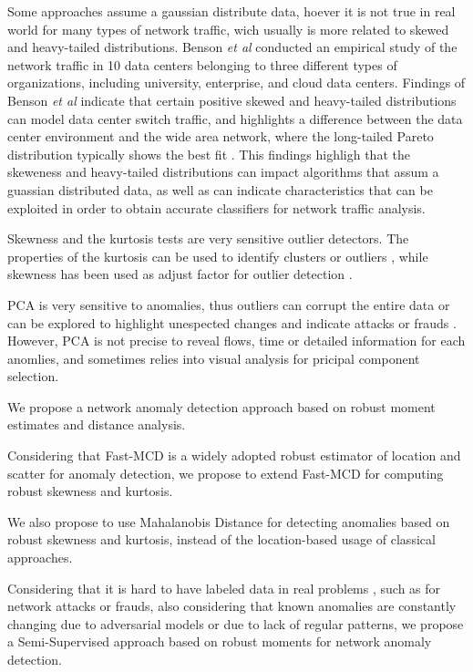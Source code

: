 \documentclass[review]{elsarticle}
\begin{document}
Some approaches assume a gaussian distribute data, hoever it is not true in real world for many types of network traffic, wich usually is more related to skewed and heavy-tailed distributions. Benson \emph{et al} \cite{benson2010network} conducted an empirical study of the network traffic in 10 data centers belonging to three different types of organizations, including university, enterprise, and cloud data centers. Findings of Benson \emph{et al} indicate that certain positive skewed and heavy-tailed distributions can model data center switch traffic, and highlights a difference between the data center environment and the wide area network, where the long-tailed Pareto distribution typically shows the best fit \cite{benson2010network}. This findings highligh that the skeweness and heavy-tailed distributions can impact algorithms that assum a guassian distributed data, as well as can indicate characteristics that can be exploited in order to obtain accurate classifiers for network traffic analysis.

Skewness and the kurtosis tests are very sensitive outlier detectors. The properties of the kurtosis can be used to identify clusters or outliers \cite{pena2010eigenvectors}, while skewness has been used as adjust factor for outlier detection \cite{hubert2009robustskewed}.

PCA is very sensitive to anomalies, thus outliers can corrupt the entire data or can be explored to highlight unespected changes and indicate attacks or frauds \cite{callegari2011novel,Lee2013,vieira2017model}. However, PCA is not precise to reveal flows, time or detailed information for each anomlies, and sometimes relies into visual analysis for pricipal component selection.

We propose a network anomaly detection approach based on robust moment estimates and distance analysis.

Considering that Fast-MCD is a widely adopted robust estimator of location and scatter for anomaly detection, we propose to extend Fast-MCD for computing robust skewness and kurtosis.

We also propose to use Mahalanobis Distance for detecting anomalies based on robust skewness and kurtosis, instead of the location-based usage of classical approaches.

Considering that it is hard to have labeled data in real problems \cite{osanaiye2016distributed}, such as for network attacks or frauds, also considering that known anomalies are constantly changing due to adversarial models or due to lack of regular patterns, we propose a Semi-Supervised approach based on robust moments for network anomaly detection.
\end{document}
